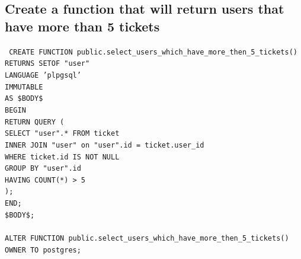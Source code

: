 \clearpage

\subsection{Create a function that will return users that have more than 5 tickets}\label{subsec:create-a-function-that-will-return-users-that-have-more-than-5-tickets}

\texttt{
    CREATE FUNCTION public.select\_users\_which\_have\_more\_then\_5\_tickets() \\
    RETURNS SETOF "user" \\
    LANGUAGE 'plpgsql' \\
    IMMUTABLE \\
    AS \$BODY\$ \\
    BEGIN\\
    RETURN QUERY (\\
    SELECT "user".* FROM ticket\\
    INNER JOIN "user" on "user".id = ticket.user\_id\\
    WHERE ticket.id IS NOT NULL\\
    GROUP BY "user".id\\
    HAVING COUNT(*) > 5\\
    );\\
    END;\\
    \$BODY\$;\\
    \\
    ALTER FUNCTION public.select\_users\_which\_have\_more\_then\_5\_tickets()\\
    OWNER TO postgres;\\
}
